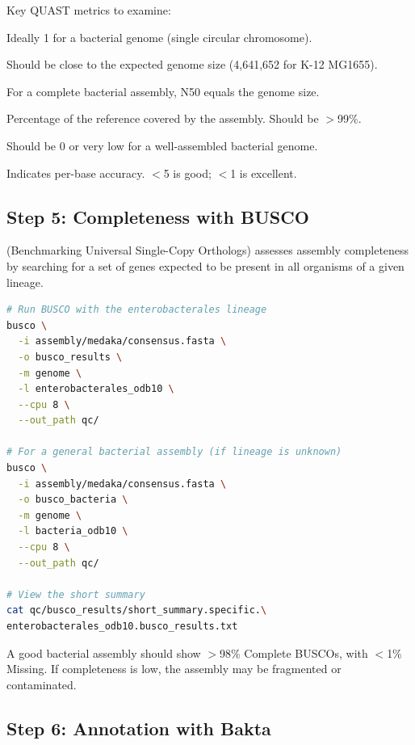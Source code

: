 Key QUAST metrics to examine:
\begin{description}[nosep]
  \item[Number of contigs] Ideally 1 for a bacterial genome (single circular chromosome).
  \item[Total length] Should be close to the expected genome size (4,641,652\basepair{} for  K-12 MG1655).
  \item[N50] For a complete bacterial assembly, N50 equals the genome size.
  \item[Genome fraction (\%)] Percentage of the reference covered by the assembly. Should be $>$99\%.
  \item[Misassemblies] Should be 0 or very low for a well-assembled bacterial genome.
  \item[Mismatches per 100\kilobase{}] Indicates per-base accuracy. $<$5 is good; $<$1 is excellent.
\end{description}

\subsection{Step 5: Completeness with BUSCO}
\label{subsec:diyanalysis:busco}

 (Benchmarking Universal Single-Copy Orthologs) assesses assembly completeness by searching for a set of genes expected to be present in all organisms of a given lineage.

\begin{lstlisting}[language=bash,caption={Running BUSCO for completeness assessment.},label=lst:diy-busco]
# Run BUSCO with the enterobacterales lineage
busco \
  -i assembly/medaka/consensus.fasta \
  -o busco_results \
  -m genome \
  -l enterobacterales_odb10 \
  --cpu 8 \
  --out_path qc/

# For a general bacterial assembly (if lineage is unknown)
busco \
  -i assembly/medaka/consensus.fasta \
  -o busco_bacteria \
  -m genome \
  -l bacteria_odb10 \
  --cpu 8 \
  --out_path qc/

# View the short summary
cat qc/busco_results/short_summary.specific.\
enterobacterales_odb10.busco_results.txt
\end{lstlisting}

A good bacterial assembly should show $>$98\% Complete BUSCOs, with $<$1\% Missing. If completeness is low, the assembly may be fragmented or contaminated.

\subsection{Step 6: Annotation with Bakta}
\label{subsec:diyanalysis:bakta}

